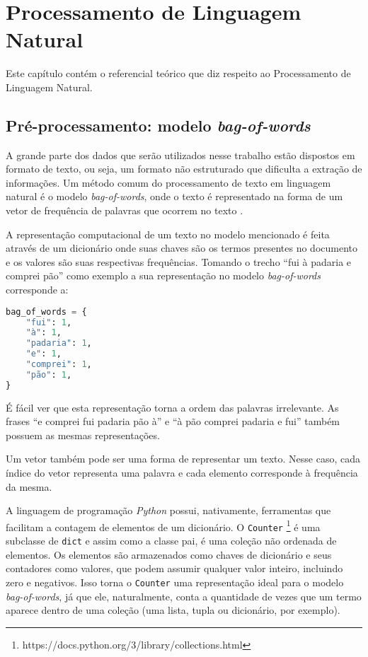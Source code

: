 \clearpage
\chapter{Processamento de Linguagem Natural}

Este capítulo contém o referencial teórico que diz respeito ao Processamento de Linguagem Natural.

\section{Pré-processamento: modelo \textit{bag-of-words}}
\label{sec:modelo_te}

A grande parte dos dados que serão utilizados nesse trabalho estão dispostos em formato de texto, ou seja, um formato não estruturado que dificulta a extração de informações. Um método comum do processamento de texto em linguagem natural é o modelo \textit{bag-of-words}, onde o texto é representado na forma de um vetor de frequência de palavras que ocorrem no texto \cite{pretext}.

A representação computacional de um texto no modelo mencionado é feita através de um dicionário onde suas chaves são os termos presentes no documento e os valores são suas respectivas frequências. Tomando o trecho ``fui à padaria e comprei pão'' como exemplo a sua representação no modelo \textit{bag-of-words} corresponde a:

\begin{lstlisting}[language=Python, caption=Representação de um trecho  no modelo bag-of-words]
bag_of_words = {
    "fui": 1,
    "à": 1,
    "padaria": 1,
    "e": 1,
    "comprei": 1,
    "pão": 1,
}
\end{lstlisting}

É fácil ver que esta representação torna a ordem das palavras irrelevante. As frases ``e comprei fui padaria pão à'' e ``à pão comprei padaria e fui'' também possuem as mesmas representações.

Um vetor também pode ser uma forma de representar um texto. Nesse caso, cada índice do vetor representa uma palavra e cada elemento corresponde à frequência da mesma.

A linguagem de programação \textit{Python} possui, nativamente, ferramentas que facilitam a contagem de elementos de um dicionário. O \texttt{Counter} \footnote{https://docs.python.org/3/library/collections.html} é uma subclasse de \texttt{dict} e assim como a classe pai, é uma coleção não ordenada de elementos. Os elementos são armazenados como chaves de dicionário e seus contadores como valores, que podem assumir qualquer valor inteiro, incluindo zero e negativos. Isso torna o \texttt{Counter} uma representação ideal para o modelo \textit{bag-of-words}, já que ele, naturalmente, conta a quantidade de vezes que um termo aparece dentro de uma coleção (uma lista, tupla ou dicionário, por exemplo).



